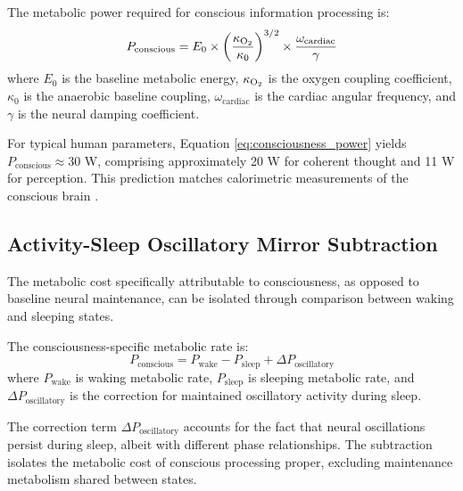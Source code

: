 \begin{theorem}
\label{thm:consciousness_power}
The metabolic power required for conscious information processing is:
\begin{equation}
P_{\text{conscious}} = E_0 \times \left(\frac{\kappa_{\ce{O2}}}{\kappa_0}\right)^{3/2} \times \frac{\omega_{\text{cardiac}}}{\gamma}
\label{eq:consciousness_power}
\end{equation}
where $E_0$ is the baseline metabolic energy, $\kappa_{\ce{O2}}$ is the oxygen coupling coefficient, $\kappa_0$ is the anaerobic baseline coupling, $\omega_{\text{cardiac}}$ is the cardiac angular frequency, and $\gamma$ is the neural damping coefficient.
\end{theorem}

For typical human parameters, Equation \ref{eq:consciousness_power} yields $P_{\text{conscious}} \approx 30$ W, comprising approximately 20 W for coherent thought and 11 W for perception. This prediction matches calorimetric measurements of the conscious brain \citep{raichle2002appraising}.

\subsection{Activity-Sleep Oscillatory Mirror Subtraction}

The metabolic cost specifically attributable to consciousness, as opposed to baseline neural maintenance, can be isolated through comparison between waking and sleeping states.

\begin{definition}
\label{def:mirror_subtraction}
The consciousness-specific metabolic rate is:
\begin{equation}
P_{\text{conscious}} = P_{\text{wake}} - P_{\text{sleep}} + \Delta P_{\text{oscillatory}}
\label{eq:mirror_subtraction}
\end{equation}
where $P_{\text{wake}}$ is waking metabolic rate, $P_{\text{sleep}}$ is sleeping metabolic rate, and $\Delta P_{\text{oscillatory}}$ is the correction for maintained oscillatory activity during sleep.
\end{definition}

The correction term $\Delta P_{\text{oscillatory}}$ accounts for the fact that neural oscillations persist during sleep, albeit with different phase relationships. The subtraction isolates the metabolic cost of conscious processing proper, excluding maintenance metabolism shared between states.

